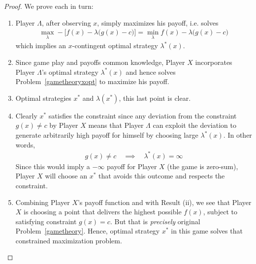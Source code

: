 \documentclass[12pt]{book}
\numberwithin{equation}{section} %
\theoremstyle{plain}
\theoremstyle{definition}
\theoremstyle{remark}
\begin{document}
\begin{proof}
We prove each in turn:
\begin{enumerate}[label=(\roman*)]
  \item
    Player $\Lambda$, after observing $x$, simply maximizes his payoff,
    i.e.  solves
    \begin{align*}
      \max_\lambda -\big[ f(x)-\lambda\big(g(x)-c\big)\big]
      =
      \min_\lambda  f(x)-\lambda\big(g(x)-c\big)
    \end{align*}
    which implies an $x$-contingent optimal strategy $\lambda^*(x)$.
  \item
    Since game play and payoffs common knowledge, Player $X$
    incorporates Player $\Lambda$'s optimal strategy $\lambda^*(x)$ and
    hence solves Problem~\ref{gametheoryxopt} to maximize his payoff.
  \item Optimal strategies $x^*$ and $\lambda(x^*)$, this last point is
    clear.
  \item
    Clearly $x^*$ satisfies the constraint
    since any deviation from the constraint $g(x)\neq c$ by Player $X$
    means that Player $\Lambda$ can exploit the deviation to generate
    arbitrarily high payoff for himself by choosing large
    $\lambda^*(x)$.
    In other words,
    \begin{align*}
      g(x)\neq c
      \quad\implies\quad
      \lambda^*(x)=\infty
    \end{align*}
    Since this would imply a $-\infty$ payoff for Player $X$ (the game
    is zero-sum), Player $X$ will choose an $x^*$ that avoids this
    outcome and respects the constraint.
  \item
    Combining Player $X$'s payoff function and with Result (ii),
    we see that Player $X$ is choosing a point that delivers the highest
    possible $f(x)$, subject to satisfying constraint $g(x)=c$.  But
    that is \emph{precisely} original Problem~\ref{gametheory}.  Hence,
    optimal strategy $x^*$ in this game solves that constrained
    maximization problem.
\end{enumerate}
\end{proof}
\end{document}
